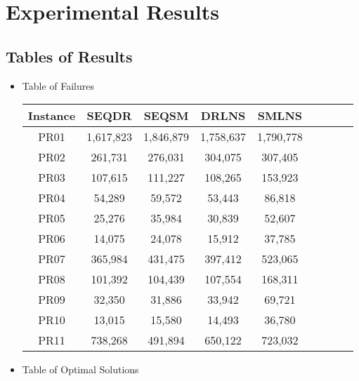 \section{Experimental Results}
\subsection{Tables of Results}
\begin{itemize}
    \item Table of Failures
    
        \begin{table}[!h]
    \label{T:instances}
        \begin{center}
        \begin{tabular}{| c | c | c | c | c | c | c | c | c | }
\hline

\textbf{Instance} & \textbf{SEQDR} & \textbf{SEQSM} & \textbf{DRLNS} & \textbf{SMLNS}  \\
\hline
PR01 & 1,617,823  & 1,846,879 &  1,758,637 & 1,790,778\\ \hline
PR02 & 261,731  & 276,031  &  304,075 & 307,405  \\ \hline
PR03 & 107,615  & 111,227 &  108,265 & 153,923 \\ \hline
PR04 & 54,289  & 59,572 &  53,443 & 86,818  \\ \hline
PR05 & 25,276  & 35,984 &  30,839 & 52,607  \\ \hline
PR06 & 14,075  & 24,078 & 15,912 & 37,785 \\ \hline
PR07 & 365,984  & 431,475 &  397,412 & 523,065  \\ \hline
PR08 & 101,392  & 104,439 &  107,554 & 168,311  \\ \hline
PR09 & 32,350  & 31,886 &  33,942 & 69,721  \\ \hline
PR10 & 13,015  & 15,580  &  14,493 & 36,780  \\ \hline
PR11 & 738,268  & 491,894 &  650,122 & 723,032  \\ \hline
\hline
\end{tabular}
\end{center}
\end{table}

    \item Table of Optimal Solutions
        \begin{table}[!h]
    \label{T:instances}
        \begin{center}
        \begin{tabular}{| c | c | c | c | c | c | c | c | c | }
\hline


\end{tabular}
\end{center}
\end{table}
\end{itemize}
